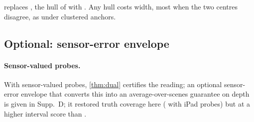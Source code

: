 \mDualBoth replaces \mDistBoth, the hull of \mDistSplit with \mLocalSplit. Any hull costs width, most when the two centres disagree, as under clustered anchors.

\ifenvelopemain
\subsection{Optional: sensor-error envelope}
\label{sec:env}

\else
\paragraph{Sensor-valued probes.} With sensor-valued probes, \cref{thm:dual} certifies the reading; an optional sensor-error envelope that converts this into an average-over-scenes guarantee on depth is given in Supp.~D; it restored truth coverage here (\NumEnvTruthCov{} with iPad probes) but at a higher interval score than \mDistBoth.
\fi
